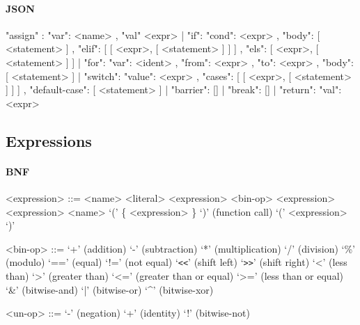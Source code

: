 \documentclass{article}
\begin{document}
\paragraph{JSON}
\begin{jsoncode}
{ "assign" : { "var": <name>
             , "val" <expr>
             }
| "if": { "cond": <expr>
        , "body": [ <statement> ]
        , "elif": [ [ <expr>, [ <statement> ] ] ]
        , "els":  [ <expr>, [ <statement> ] ]
        }
| "for": { "var": <ident>
         , "from": <expr>
         , "to": <expr>
         , "body": [ <statement> ]
         }
| "switch": { "value": <expr>
            , "cases": [ [ <expr>, [ <statement> ] ] ]
            , "default-case": [ <statement> ]
            }
| "barrier": []
| "break": []
| "return": { "val": <expr> }
}

\end{jsoncode}
\subsection{Expressions}
\paragraph{BNF}
\begin{grammar}
  <expression> ::= <name>
  \alt <literal>
  \alt <expression> <bin-op> <expression>
   <expression>
  \alt <name> `(' \{ <expression> \}  `)' (function call)
  \alt `(' <expression> `)'

  <bin-op> ::= `+' (addition)
  \alt `-' (subtraction)
  \alt `*' (multiplication)
  \alt `/' (division)
  \alt `\%' (modulo)
  \alt `==' (equal)
  \alt `!=' (not equal)
  \alt `\verb!<<!' (shift left)
  \alt `\verb!>>!' (shift right)
  \alt `<' (less than)
  \alt `>' (greater than)
  \alt `<=' (greater than or equal)
  \alt `>=' (less than or equal)
  \alt `\&' (bitwise-and)
  \alt `|' (bitwise-or)
  \alt `^' (bitwise-xor)

  <un-op> ::= `-' (negation)
  \alt `+' (identity)
  \alt `!' (bitwise-not)

\end{grammar}
\end{document}
